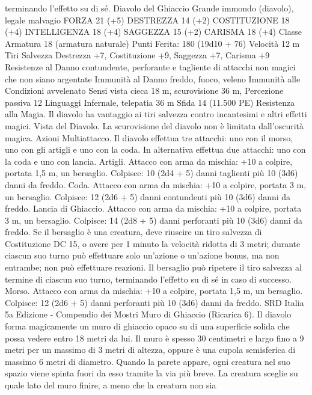 \begin{multicols}{2}
terminando l’effetto su di sé.
Diavolo del Ghiaccio
Grande immondo (diavolo), legale malvagio
FORZA 21 (+5)
DESTREZZA 14 (+2)
COSTITUZIONE 18 (+4)
INTELLIGENZA 18 (+4)
SAGGEZZA 15 (+2)
CARISMA 18 (+4)
Classe Armatura 18 (armatura naturale)
\hspace*{0pt}\hfill{Punti Ferita}: 180 (19d10 + 76)
Velocità 12 m
Tiri Salvezza Destrezza +7, Costituzione +9, Saggezza +7,
Carisma +9
Resistenze al Danno contundente, perforante e tagliente di
attacchi non magici che non siano argentate
Immunità al Danno freddo, fuoco, veleno
Immunità alle Condizioni avvelenato
Sensi vista cieca 18 m, scurovisione 36 m, Percezione passiva 12
Linguaggi Infernale, telepatia 36 m
Sfida 14 (11.500 PE)
Resistenza alla Magia. Il diavolo ha vantaggio ai tiri salvezza
contro incantesimi e altri effetti magici.
Vista del Diavolo. La scurovisione del diavolo non è limitata
dall’oscurità magica.
Azioni
Multiattacco. Il diavolo effettua tre attacchi: uno con il morso,
uno con gli artigli e uno con la coda. In alternativa effettua due
attacchi: uno con la coda e uno con lancia.
Artigli. Attacco con arma da mischia: +10 a colpire, portata 1,5
m, un bersaglio.
Colpisce: 10 (2d4 + 5) danni taglienti più 10 (3d6) danni da
freddo.
Coda. Attacco con arma da mischia: +10 a colpire, portata 3 m,
un bersaglio.
Colpisce: 12 (2d6 + 5) danni contundenti più 10 (3d6) danni da
freddo.
Lancia di Ghiaccio. Attacco con arma da mischia: +10 a colpire,
portata 3 m, un bersaglio.
Colpisce: 14 (2d8 + 5) danni perforanti più 10 (3d6) danni da
freddo. Se il bersaglio è una creatura, deve riuscire un tiro
salvezza di Costituzione DC 15, o avere per 1 minuto la velocità
ridotta di 3 metri; durante ciascun suo turno può effettuare solo
un’azione o un’azione bonus, ma non entrambe; non può
effettuare reazioni. Il bersaglio può ripetere il tiro salvezza al
termine di ciascun suo turno, terminando l’effetto su di sé in caso
di successo.
Morso. Attacco con arma da mischia: +10 a colpire, portata 1,5
m, un bersaglio.
Colpisce: 12 (2d6 + 5) danni perforanti più 10 (3d6) danni da
freddo.
SRD Italia 5a Edizione - Compendio dei Mostri
Muro di Ghiaccio (Ricarica 6). Il diavolo forma magicamente
un muro di ghiaccio opaco su di una superficie solida che possa
vedere entro 18 metri da lui. Il muro è spesso 30 centimetri e
largo fino a 9 metri per un massimo di 3 metri di altezza, oppure
è una cupola semisferica di massimo 6 metri di diametro.
Quando la parete appare, ogni creatura nel suo spazio viene
spinta fuori da esso tramite la via più breve. La creatura sceglie
su quale lato del muro finire, a meno che la creatura non sia

\end{multicols}

